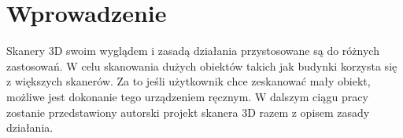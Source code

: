 \section{Wprowadzenie}
Skanery 3D swoim wyglądem i zasadą działania przystosowane są do różnych zastosowań. W celu skanowania dużych obiektów takich jak budynki korzysta się z większych skanerów. Za to jeśli użytkownik chce zeskanować mały obiekt, możliwe jest dokonanie tego urządzeniem ręcznym. W dalszym ciągu pracy zostanie przedstawiony autorski projekt skanera 3D razem z opisem zasady działania.
